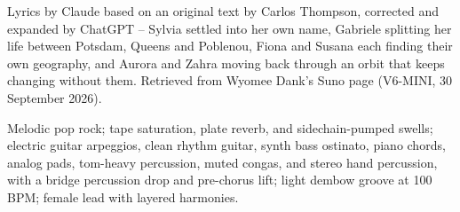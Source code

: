 
\begin{notes}
Lyrics by Claude based on an original text by Carlos Thompson, corrected and expanded by ChatGPT -- Sylvia settled into her own name, Gabriele splitting her life between Potsdam, Queens and Poblenou, Fiona and Susana each finding their own geography, and Aurora and Zahra moving back through an orbit that keeps changing without them. Retrieved from Wyomee Dank's Suno page (V6-MINI, 30 September 2026).
\end{notes}
\begin{style}
Melodic pop rock; tape saturation, plate reverb, and sidechain-pumped swells; electric guitar arpeggios, clean rhythm guitar, synth bass ostinato, piano chords, analog pads, tom-heavy percussion, muted congas, and stereo hand percussion, with a bridge percussion drop and pre-chorus lift; light dembow groove at 100 BPM; female lead with layered harmonies.
\end{style}
